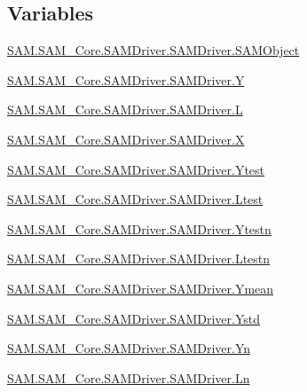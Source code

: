\subsection*{Variables}
\begin{DoxyCompactItemize}
\item 
\hyperlink{group__icubclient__SAM__Drivers_ga58c437c869d397cc69296ba13eecbce2}{S\+A\+M.\+S\+A\+M\+\_\+\+Core.\+S\+A\+M\+Driver.\+S\+A\+M\+Driver.\+S\+A\+M\+Object}
\item 
\hyperlink{group__icubclient__SAM__Drivers_ga462d762fee5145a93abaccf45505391d}{S\+A\+M.\+S\+A\+M\+\_\+\+Core.\+S\+A\+M\+Driver.\+S\+A\+M\+Driver.\+Y}
\item 
\hyperlink{group__icubclient__SAM__Drivers_gad584d554bc3c5c82f75c37d69c66add2}{S\+A\+M.\+S\+A\+M\+\_\+\+Core.\+S\+A\+M\+Driver.\+S\+A\+M\+Driver.\+L}
\item 
\hyperlink{group__icubclient__SAM__Drivers_gaafcaf934890fe0ea13e17f384868b07d}{S\+A\+M.\+S\+A\+M\+\_\+\+Core.\+S\+A\+M\+Driver.\+S\+A\+M\+Driver.\+X}
\item 
\hyperlink{group__icubclient__SAM__Drivers_ga47e71ceed497adbec4ba952b4385d8b1}{S\+A\+M.\+S\+A\+M\+\_\+\+Core.\+S\+A\+M\+Driver.\+S\+A\+M\+Driver.\+Ytest}
\item 
\hyperlink{group__icubclient__SAM__Drivers_ga25f88f3ef7b54ea69fba9ef30fe929bd}{S\+A\+M.\+S\+A\+M\+\_\+\+Core.\+S\+A\+M\+Driver.\+S\+A\+M\+Driver.\+Ltest}
\item 
\hyperlink{group__icubclient__SAM__Drivers_ga8ce3d609c06b6374b1c18a8236042186}{S\+A\+M.\+S\+A\+M\+\_\+\+Core.\+S\+A\+M\+Driver.\+S\+A\+M\+Driver.\+Ytestn}
\item 
\hyperlink{group__icubclient__SAM__Drivers_gad85dff96ce76cf33eb3c2806c88339ce}{S\+A\+M.\+S\+A\+M\+\_\+\+Core.\+S\+A\+M\+Driver.\+S\+A\+M\+Driver.\+Ltestn}
\item 
\hyperlink{group__icubclient__SAM__Drivers_ga8744836c0d908359d2de313417311dac}{S\+A\+M.\+S\+A\+M\+\_\+\+Core.\+S\+A\+M\+Driver.\+S\+A\+M\+Driver.\+Ymean}
\item 
\hyperlink{group__icubclient__SAM__Drivers_gab4f0e7e943deb9806f07908a5aaa36fe}{S\+A\+M.\+S\+A\+M\+\_\+\+Core.\+S\+A\+M\+Driver.\+S\+A\+M\+Driver.\+Ystd}
\item 
\hyperlink{group__icubclient__SAM__Drivers_ga2317645ba1bb66c3c7527687cfe3262e}{S\+A\+M.\+S\+A\+M\+\_\+\+Core.\+S\+A\+M\+Driver.\+S\+A\+M\+Driver.\+Yn}
\item 
\hyperlink{group__icubclient__SAM__Drivers_ga22a80ec6fb07792d354d1267e52c3b7c}{S\+A\+M.\+S\+A\+M\+\_\+\+Core.\+S\+A\+M\+Driver.\+S\+A\+M\+Driver.\+Ln}

\end{DoxyCompactItemize}
